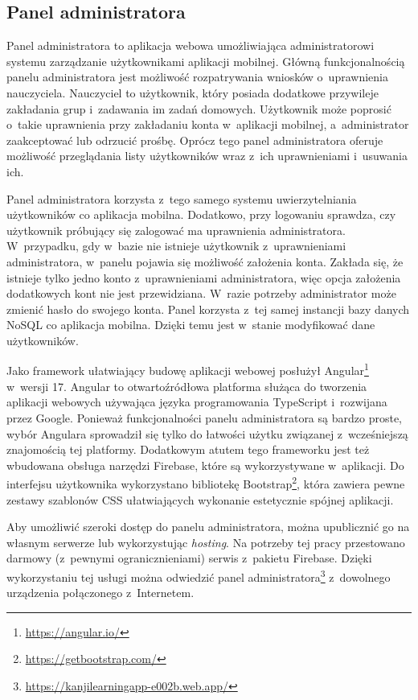 \documentclass[a4paper,twoside,12pt]{book}
\newcommand{\obcy}[1]{\emph{#1}}
\newcommand{\english}[1]{{\selectlanguage{british}\obcy{#1}}}
\begin{document}
\subsection{Panel administratora}
Panel administratora to aplikacja webowa umożliwiająca administratorowi systemu zarządzanie użytkownikami aplikacji mobilnej. Główną funkcjonalnością panelu administratora jest możliwość rozpatrywania wniosków o~uprawnienia nauczyciela. Nauczyciel to użytkownik, który posiada dodatkowe przywileje zakładania grup i~zadawania im zadań domowych. Użytkownik może poprosić o~takie uprawnienia przy zakładaniu konta w~aplikacji mobilnej, a~administrator zaakceptować lub odrzucić prośbę. Oprócz tego panel administratora oferuje możliwość przeglądania listy użytkowników wraz z~ich uprawnieniami i~usuwania ich.

Panel administratora korzysta z~tego samego systemu uwierzytelniania użytkowników co aplikacja mobilna. Dodatkowo, przy logowaniu sprawdza, czy użytkownik próbujący się zalogować ma uprawnienia administratora. W~przypadku, gdy w~bazie nie istnieje użytkownik z~uprawnieniami administratora, w~panelu pojawia się możliwość założenia konta. Zakłada się, że istnieje tylko jedno konto z~uprawnieniami administratora, więc opcja założenia dodatkowych kont nie jest przewidziana. W~razie potrzeby administrator może zmienić hasło do swojego konta. Panel korzysta z~tej samej instancji bazy danych NoSQL co aplikacja mobilna. Dzięki temu jest w~stanie modyfikować dane użytkowników. 

Jako framework ułatwiający budowę aplikacji webowej posłużył Angular\footnote{\url{https://angular.io/}} w~wersji 17. Angular to otwartoźródłowa platforma służąca do tworzenia aplikacji webowych używająca języka programowania TypeScript i~rozwijana przez Google. Ponieważ funkcjonalności panelu administratora są bardzo proste, wybór Angulara sprowadził się tylko do łatwości użytku związanej z~wcześniejszą znajomością tej platformy. Dodatkowym atutem tego frameworku jest też wbudowana obsługa narzędzi Firebase, które są wykorzystywane w~aplikacji. Do interfejsu użytkownika wykorzystano bibliotekę Bootstrap\footnote{\url{https://getbootstrap.com/}}, która zawiera pewne zestawy szablonów CSS ułatwiających wykonanie estetycznie spójnej aplikacji.

Aby umożliwić szeroki dostęp do panelu administratora, można upublicznić go na własnym serwerze lub wykorzystując \english{hosting}. Na potrzeby tej pracy przestowano darmowy (z~pewnymi ogranicznieniami) serwis z~pakietu Firebase. Dzięki wykorzystaniu tej usługi można odwiedzić panel administratora\footnote{\url{https://kanjilearningapp-e002b.web.app/}} z~dowolnego urządzenia połączonego  z~Internetem.
\end{document}
